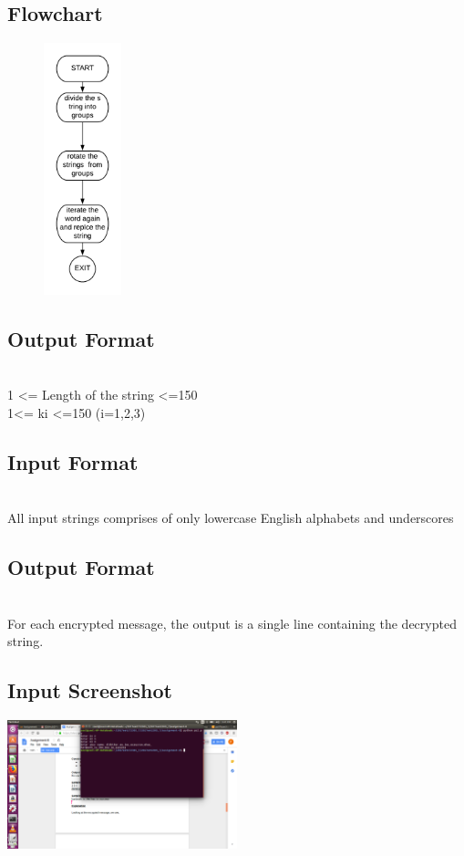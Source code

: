 \documentclass[12pt]{article}
\begin{document}
\subsection{Flowchart}
\begin{figure}[h]
	\centering
\includegraphics[width=0.2\textwidth]{ps2flow.png}\\
\end{figure}
\newpage


\subsection{Output Format}
{
\textbf{} \\
1 <= Length of the string <=150\\
1<= ki <=150 (i=1,2,3)
}
\subsection{Input Format}

{
\textbf{} \\
All input strings comprises of only lowercase English alphabets and underscores


}


\subsection{Output Format}
{
\textbf{} \\
For each encrypted message, the output is a single line containing the decrypted string.
}

\subsection{Input Screenshot}
\includegraphics[width=0.5\textwidth]{ps2screenshot.png}
\end{document}
